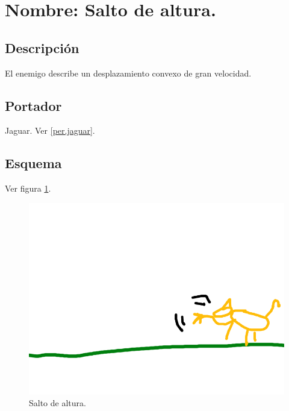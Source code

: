 			\section{Nombre: Salto de altura.} \label{hab.SalAl}
			\subsection{Descripción}
			El enemigo describe un desplazamiento convexo de gran velocidad. 
			\subsection{Portador}
			Jaguar. Ver \ref{per.jaguar}.
			\subsection{Esquema}
			Ver figura \ref{fig:SalAl}.
			\begin{figure}
				\centering
				\includegraphics[height=0.2 \textheight]{Imagenes/zarpazo}
				\caption{Salto de altura.}
				\label{fig:SalAl}
			\end{figure}